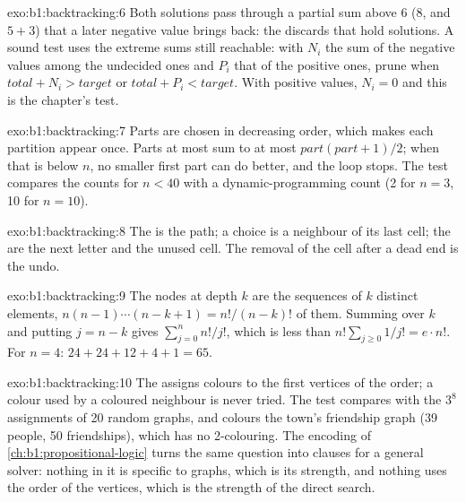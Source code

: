 \begin{solution}{exo:b1:backtracking:6}
Both solutions pass through a partial sum above 6 (8, and $5 + 3$) that a later negative value brings back: the
 discards  that hold solutions. A sound test uses the extreme sums still reachable: with $N_i$ the sum
of the negative values among the undecided ones and $P_i$ that of the positive ones, prune when $\mathit{total} + N_i >
\mathit{target}$ or $\mathit{total} + P_i < \mathit{target}$. With positive values, $N_i = 0$ and this is the chapter's
test.
\end{solution}

\begin{solution}{exo:b1:backtracking:7}
Parts are chosen in decreasing order, which makes each partition appear once. Parts at most  sum to at most
$\mathit{part}(\mathit{part} + 1)/2$; when that is below $n$, no smaller first part can do better, and the loop stops.
The test compares the counts for $n < 40$ with a dynamic-programming count (2 for $n = 3$, 10 for $n = 10$).
\end{solution}

\begin{solution}{exo:b1:backtracking:8}
The  is the path; a choice is a neighbour of its last cell; the  are the next letter and
the unused cell. The removal of the cell after a dead end is the undo.
\end{solution}

\begin{solution}{exo:b1:backtracking:9}
The nodes at depth $k$ are the sequences of $k$ distinct elements, $n(n - 1) \cdots (n - k + 1) = n!/(n - k)!$ of them.
Summing over $k$ and putting $j = n - k$ gives $\sum_{j=0}^{n} n!/j!$, which is less than $n! \sum_{j \geq 0} 1/j! = e
\cdot n!$. For $n = 4$: $24 + 24 + 12 + 4 + 1 = 65$.
\end{solution}

\begin{solution}{exo:b1:backtracking:10}
The  assigns colours to the first vertices of the order; a colour used by a coloured neighbour is never
tried. The test compares with the $3^8$ assignments of 20 random graphs, and colours the town's friendship graph (39
people, 50 friendships), which has no 2-colouring. The encoding of \cref{ch:b1:propositional-logic} turns the same
question into clauses for a general solver: nothing in it is specific to graphs, which is its strength, and nothing
uses the order of the vertices, which is the strength of the direct search.
\end{solution}

